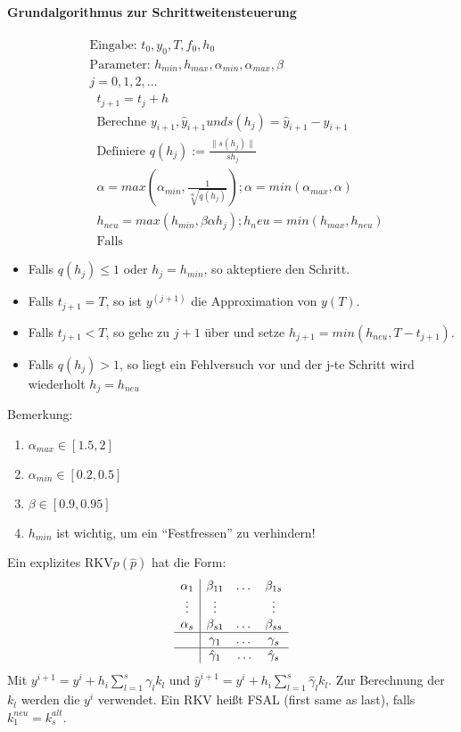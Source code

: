 \paragraph{Grundalgorithmus zur Schrittweitensteuerung}
\begin{align*}
	&\text{Eingabe: } t_0, y_0, T, f_0, h_0\\
	&\text{Parameter: } h_{min}, h_{max}, \alpha_{min}, \alpha_{max}, \beta\\
	&j = 0, 1, 2, \dots\\
	&\;\;t_{j+1} = t_j + h\\
	&\;\;\text{Berechne } y_{i+1}, \hat{y}_{i+1} und s(h_j) = \hat{y}_{i+1} - y_{i+1}\\
	&\;\;\text{Definiere } q(h_j) := \frac{\|s(h_j)\|}{s h_j}\\
	&\;\;\alpha = max(\alpha_{min}, \frac{1}{\sqrt[\infty]{q(h_j)}}); \alpha = min(\alpha_{max}, \alpha)\\
	&\;\;h_{neu} = max(h_{min}, \beta \alpha h_j); h_neu = min(h_{max}, h_{neu})\\
	&\;\;\text{Falls } 
\end{align*}

\begin{itemize}
	\item Falls $q(h_j) \le 1$ oder $h_j = h_{min}$, so akteptiere den Schritt.
	\item Falls $t_{j+1} = T$, so ist $y^{(j+1)}$ die Approximation von $y(T)$.
	\item Falls $t_{j+1} < T$, so gehe zu $j+1$ über und setze $h_{j+1} = min(h_{neu}, T - t_{j+1})$.
	\item Falls $q(h_j) > 1$, so liegt ein Fehlversuch vor und der j-te Schritt wird wiederholt $h_j = h_{neu}$
\end{itemize}

Bemerkung:
\begin{enumerate}
	\item $\alpha_{max} \in [1.5, 2]$
	\item $\alpha_{min} \in [0.2, 0.5]$
	\item $\beta \in [0.9, 0.95]$
	\item $h_{min}$ ist wichtig, um ein ``Festfressen'' zu verhindern!
\end{enumerate}

\begin{definition}
	 Ein explizites RKV$p(\hat p)$ hat die Form:
	$$\begin{array}{c|ccc}
			\alpha_1 & \beta_{11} & \dots & \beta_{1s} \\
			\vdots   & \vdots     &       & \vdots \\
			\alpha_s & \beta_{s1} & \dots & \beta_{ss} \\
			\hline & \gamma_{1} & \dots & \gamma_{s} \\
			\hline & \hat \gamma_{1}& \ldots & \hat \gamma_{s}
		\end{array}$$
		Mit $y^{i+1}=y^{i}+h_{i}\sum_{l=1}^{s}\gamma_{l}k_{l}$ und $\hat y^{i+1}= y^{i}+ h_{i}\sum_{l=1}^{s}\hat \gamma_{l}k_{l}$.
		Zur Berechnung der $k_{l}$ werden die $y^{i}$ verwendet. Ein RKV heißt FSAL (first same as last), falls $k_{1}^{neu}=k_{s}^{alt}$.
\end{definition}

